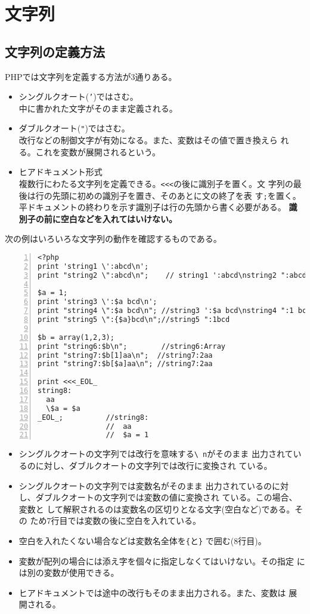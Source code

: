 \section{文字列}
\subsection{文字列の定義方法}PHPでは文字列を定義する方法が3通りある。
\begin{itemize}
 \item シングルクオート(\texttt{'})ではさむ。\\
   中に書かれた文字がそのまま定義される。
 \item ダブルクオート(\Verb+"+)ではさむ。%
       \\改行などの制御文字が有効になる。また、変数はその値で置き換えら
       れる。これを変数が展開されるという。
 \item ヒアドキュメント形式\\
   複数行にわたる文字列を定義できる。\texttt{<<<}の後に識別子を置く。文
       字列の最後は行の先頭に初めの識別子を置き、そのあとに文の終了を表
       す\texttt{;}を置く。平ドキュメントの終わりを示す識別子は行の先頭から書く必要がある。
       {\bfseries 識別子の前に空白などを入れてはいけない。}
\end{itemize}
\begin{Exec}\upshape
次の例はいろいろな文字列の動作を確認するものである。
\begin{Verbatim}[numbers=left]
<?php
print 'string1 \':abcd\n';
print "string2 \":abcd\n";    // string1 ':abcd\nstring2 ":abcd

$a = 1;
print 'string3 \':$a bcd\n';
print "string4 \":$a bcd\n"; //string3 ':$a bcd\nstring4 ":1 bcd
print "string5 \":{$a}bcd\n";//string5 ":1bcd

$b = array(1,2,3);
print "string6:$b\n";        //string6:Array
print "string7:$b[1]aa\n";  //string7:2aa
print "string7:$b[$a]aa\n"; //string7:2aa

print <<<_EOL_
string8:
  aa
  \$a = $a
_EOL_;          //string8:
                //  aa
                //  $a = 1
\end{Verbatim}
\begin{itemize}
 \item シングルクオートの文字列では改行を意味する\texttt{\textbackslash
       n}がそのまま
       出力されているのに対し、ダブルクオートの文字列では改行に変換され
       ている。
 \item シングルクオートの文字列では変数名がそのまま
       出力されているのに対し、ダブルクオートの文字列では変数の値に変換され
       ている。この場合、変数と
       して解釈されるのは変数名の区切りとなる文字(空白など)である。その
       ため7行目では変数の後に空白を入れている。
 \item 空白を入れたくない場合などは変数名全体を\texttt{\{}と\texttt{\}}
       で囲む(8行目)。
 \item 変数が配列の場合には添え字を個々に指定しなくてはいけない。その指定
       には別の変数が使用できる。
 \item ヒアドキュメントでは途中の改行もそのまま出力される。また、変数は
       展開される。
\end{itemize}
\end{Exec}

